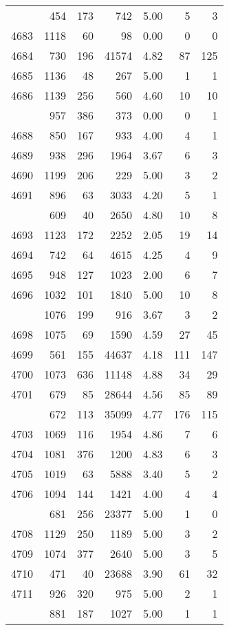 \documentclass[
]{article}
\begin{document}
\begin{table}
\begin{tabular}[t]{lrrrrrr}
\addlinespace
4682 & 454 & 173 & 742 & 5.00 & 5 & 3\\
4683 & 1118 & 60 & 98 & 0.00 & 0 & 0\\
4684 & 730 & 196 & 41574 & 4.82 & 87 & 125\\
4685 & 1136 & 48 & 267 & 5.00 & 1 & 1\\
4686 & 1139 & 256 & 560 & 4.60 & 10 & 10\\
\addlinespace
4687 & 957 & 386 & 373 & 0.00 & 0 & 1\\
4688 & 850 & 167 & 933 & 4.00 & 4 & 1\\
4689 & 938 & 296 & 1964 & 3.67 & 6 & 3\\
4690 & 1199 & 206 & 229 & 5.00 & 3 & 2\\
4691 & 896 & 63 & 3033 & 4.20 & 5 & 1\\
\addlinespace
4692 & 609 & 40 & 2650 & 4.80 & 10 & 8\\
4693 & 1123 & 172 & 2252 & 2.05 & 19 & 14\\
4694 & 742 & 64 & 4615 & 4.25 & 4 & 9\\
4695 & 948 & 127 & 1023 & 2.00 & 6 & 7\\
4696 & 1032 & 101 & 1840 & 5.00 & 10 & 8\\
\addlinespace
4697 & 1076 & 199 & 916 & 3.67 & 3 & 2\\
4698 & 1075 & 69 & 1590 & 4.59 & 27 & 45\\
4699 & 561 & 155 & 44637 & 4.18 & 111 & 147\\
4700 & 1073 & 636 & 11148 & 4.88 & 34 & 29\\
4701 & 679 & 85 & 28644 & 4.56 & 85 & 89\\
\addlinespace
4702 & 672 & 113 & 35099 & 4.77 & 176 & 115\\
4703 & 1069 & 116 & 1954 & 4.86 & 7 & 6\\
4704 & 1081 & 376 & 1200 & 4.83 & 6 & 3\\
4705 & 1019 & 63 & 5888 & 3.40 & 5 & 2\\
4706 & 1094 & 144 & 1421 & 4.00 & 4 & 4\\
\addlinespace
4707 & 681 & 256 & 23377 & 5.00 & 1 & 0\\
4708 & 1129 & 250 & 1189 & 5.00 & 3 & 2\\
4709 & 1074 & 377 & 2640 & 5.00 & 3 & 5\\
4710 & 471 & 40 & 23688 & 3.90 & 61 & 32\\
4711 & 926 & 320 & 975 & 5.00 & 2 & 1\\
\addlinespace
4712 & 881 & 187 & 1027 & 5.00 & 1 & 1\\

\end{tabular}
\end{table}
\end{document}
